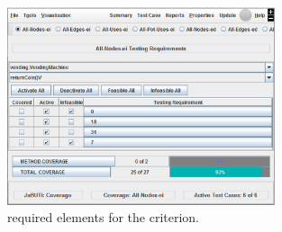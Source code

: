 
\begin{figure}[!ht]
\begin{center}
\includegraphics[width=0.70\textwidth]{fig/required-elements.eps}
\caption{\label{fig:requirements} 
required elements for the  criterion.}
\end{center}
\end{figure}
